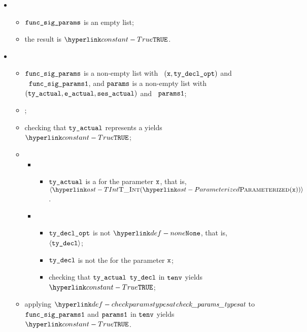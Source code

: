 \ProseParagraph
\OneApplies
\begin{itemize}
  \item {}
  \begin{itemize}
    \item $\texttt{func\_sig\_params}$ is an empty list;
    \item the result is $\True$.
  \end{itemize}

  \item \AllApply
  \begin{itemize}
    \item $\texttt{func\_sig\_params}$ is a non-empty list with \head\ $(\texttt{x}, \texttt{ty\_decl\_opt})$ and \\
          \tail\ $\texttt{func\_sig\_params1}$, and
          $\texttt{params}$ is a non-empty list with \head\ \\
          $(\texttt{ty\_actual}, \texttt{e\_actual}, \texttt{ses\_actual})$ and \tail\ $\texttt{params1}$;
    \item \Prosechecksymbolicallyevaluable{$\vsesactual$};
    \item checking that $\texttt{ty\_actual}$ represents a \constrainedinteger{} yields $\True$\ProseOrTypeError;
    \item \OneApplies
    \begin{itemize}
      \item {}
      \begin{itemize}
        \item $\texttt{ty\_actual}$ is a \parameterizedintegertype{} for the parameter $\texttt{x}$, that is, \\
              $\langle\TInt(\Parameterized(\vx))\rangle$.
      \end{itemize}

      \item {}
      \begin{itemize}
        \item $\texttt{ty\_decl\_opt}$ is not $\None$, that is, $\langle\texttt{ty\_decl}\rangle$;
        \item $\texttt{ty\_decl}$ is not the \parameterizedintegertype{} for the parameter $\texttt{x}$;
        \item checking that $\texttt{ty\_actual}$ \typesatisfies{} $\texttt{ty\_decl}$ in $\texttt{tenv}$ yields
              $\True$\ProseOrTypeError;
      \end{itemize}
    \end{itemize}
    \item applying $\checkparamstypesat$ to $\texttt{func\_sig\_params1}$ and $\texttt{params1}$ in $\texttt{tenv}$
          yields \\ $\True$\ProseOrTypeError.
  \end{itemize}
\end{itemize}

